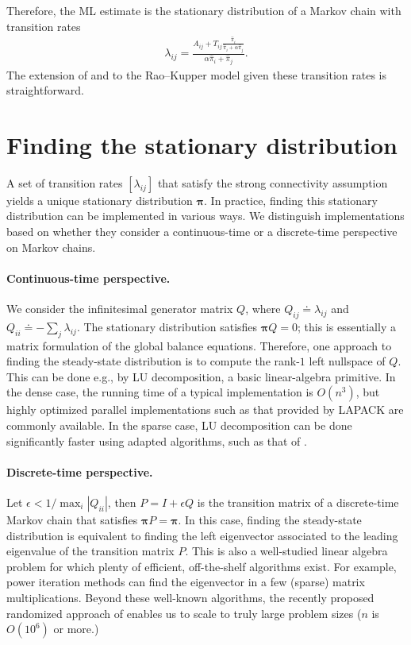 Therefore, the ML estimate is the stationary distribution of a Markov chain with transition rates
\begin{align}
\lambda_{ij} = \frac{A_{ij} + T_{ij}\tfrac{\hat{\pi}_i}{\hat{\pi}_i + \alpha \hat{\pi}_j}}{\alpha \hat{\pi}_i + \hat{\pi}_j}.
\end{align}
The extension of \LSR{} and \ILSR{} to the Rao--Kupper model given these transition rates is straightforward.



\section{Finding the stationary distribution}

A set of transition rates $[\lambda_{ij}]$ that satisfy the strong connectivity assumption yields a unique stationary distribution $\bm{\pi}$.
In practice, finding this stationary distribution can be implemented in various ways.
We distinguish implementations based on whether they consider a continuous-time or a discrete-time perspective on Markov chains.

\paragraph{Continuous-time perspective.}
We consider the infinitesimal generator matrix $Q$, where $Q_{ij} \doteq \lambda_{ij}$ and $Q_{ii} \doteq - \sum_{j} \lambda_{ij}$.
The stationary distribution satisfies $\bm{\pi} Q = 0$; this is essentially a matrix formulation of the global balance equations.
Therefore, one approach to finding the steady-state distribution is to compute the rank-$1$ left nullspace of $Q$.
This can be done e.g., by LU decomposition, a basic linear-algebra primitive.
In the dense case, the running time of a typical implementation is $O(n^3)$, but highly optimized parallel implementations such as that provided by LAPACK \citep{anderson1999lapack} are commonly available.
In the sparse case, LU decomposition can be done significantly faster using adapted algorithms, such as that of \citet{demmel1999supernodal}.

\paragraph{Discrete-time perspective.}
Let $\epsilon < 1 / \max_i |Q_{ii}|$, then $P = I + \epsilon Q$ is the transition matrix of a discrete-time Markov chain that satisfies $\bm{\pi} P = \bm{\pi}$.
In this case, finding the steady-state distribution is equivalent to finding the left eigenvector associated to the leading eigenvalue of the transition matrix $P$.
This is also a well-studied linear algebra problem for which plenty of efficient, off-the-shelf algorithms exist.
For example, power iteration methods can find the eigenvector in a few (sparse) matrix multiplications.
Beyond these well-known algorithms, the recently proposed randomized approach of \citet{halko2011finding} enables us to scale to truly large problem sizes ($n$ is $O(10^6)$ or more.)

